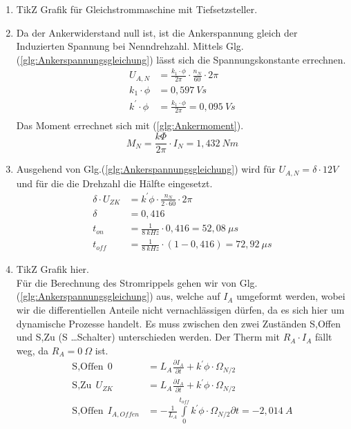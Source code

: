 \begin{solution}
\begin{enumerate}
\item TikZ Grafik f\"ur Gleichstrommaschine mit Tiefsetzsteller.
\item Da der Ankerwiderstand null ist, ist die Ankerspannung gleich der Induzierten Spannung bei Nenndrehzahl. Mittels Glg.(\ref{glg:Ankerspannungsgleichung}) l\"asst sich die Spannungskonstante errechnen.
\begin{align}
U_{A,N} &= \frac{k_1 \cdot \phi}{2 \pi} \cdot \frac{n_N}{60} \cdot 2 \pi\\
k_1 \cdot \phi &= 0,597~Vs\\
k^{'} \cdot \phi &= \frac{k_1 \cdot \phi}{2 \pi} = 0,095~Vs\\
\end{align}
Das Moment errechnet sich mit (\ref{glg:Ankermoment}).\\
\begin{equation}
M_N=\frac{k \Phi}{2 \pi} \cdot I_N =1,432~Nm
\end{equation}
\item Ausgehend von Glg.(\ref{glg:Ankerspannungsgleichung}) wird f\"ur $U_{A,N} = \delta \cdot 12V$ und f\"ur die die Drehzahl die H\"alfte eingesetzt.
\begin{align}
\delta \cdot U_{ZK} &= k^{'} \phi \cdot \frac{n_N}{2 \cdot 60} \cdot 2 \pi \\
\delta &= 0,416\\
t_{on} &= \frac{1}{8~kHz} \cdot 0,416 = 52,08~\mu s\\
t_{off} &= \frac{1}{8~kHz} \cdot(1- 0,416) = 72,92~\mu s
\end{align}
\item TikZ Grafik hier.\\
F\"ur die Berechnung des Stromrippels gehen wir von Glg.(\ref{glg:Ankerspannungsgleichung}) aus, welche auf $I_A$ umgeformt werden, wobei wir die differentiellen Anteile nicht vernachl\"assigen d\"urfen, da es sich hier um dynamische Prozesse handelt. Es muss zwischen den zwei Zust\"anden S,Offen und S,Zu (S \dots Schalter) unterschieden werden. Der Therm mit $R_A \cdot I_A$ f\"allt weg, da $R_A= 0~\Omega$ ist.
\begin{align}
\text{S,Offen}~~ 0 &= L_A \frac{\partial I_A}{\partial t} + k^{'} \phi \cdot \Omega_{N/2}\\
\text{S,Zu}~~ U_{ZK} &= L_A \frac{\partial I_A}{\partial t} + k^{'} \phi \cdot \Omega_{N/2}\\
\text{S,Offen} ~~ I_{A,Offen} &= -\frac{1}{L_A} \int \limits_{0}^{t_{off}} k^{'} \phi \cdot \Omega_{N/2} \partial t=-2,014~A\\

\end{align}
\end{enumerate}
\end{solution}
